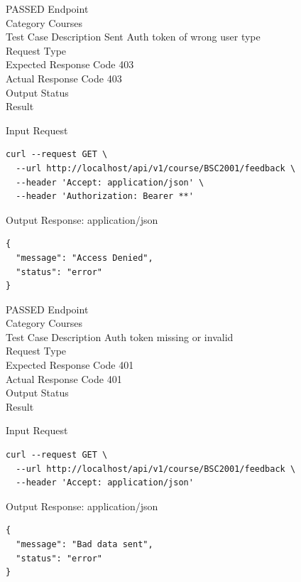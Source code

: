 \begin{testcase}{83}{PASSED}
Endpoint \hfill {}\\
Category \hfill Courses\\
Test Case Description \hfill Sent Auth token of wrong user type\\

Request Type    \hfill {}\\
Expected Response Code    \hfill 403\\
Actual Response Code    \hfill 403\\

Output Status \hfill {}\\
Result \hfill {}

\begin{ipblock}{Input Request}
\begin{verbatim}
curl --request GET \
  --url http://localhost/api/v1/course/BSC2001/feedback \
  --header 'Accept: application/json' \
  --header 'Authorization: Bearer **'
\end{verbatim}
\end{ipblock}

\begin{opblock}{Output Response: application/json}
\begin{verbatim}
{
  "message": "Access Denied",
  "status": "error"
}
\end{verbatim}
\end{opblock}
\end{testcase}

\begin{testcase}{84}{PASSED}
Endpoint \hfill {}\\
Category \hfill Courses\\
Test Case Description \hfill Auth token missing or invalid\\

Request Type    \hfill {}\\
Expected Response Code    \hfill 401\\
Actual Response Code    \hfill 401\\

Output Status \hfill {}\\
Result \hfill \tcstatus{PASSED}

\begin{ipblock}{Input Request}
\begin{verbatim}
curl --request GET \
  --url http://localhost/api/v1/course/BSC2001/feedback \
  --header 'Accept: application/json' 
\end{verbatim}
\end{ipblock}

\begin{opblock}{Output Response: application/json}
\begin{verbatim}
{
  "message": "Bad data sent",
  "status": "error"
}
\end{verbatim}
\end{opblock}
\end{testcase}

